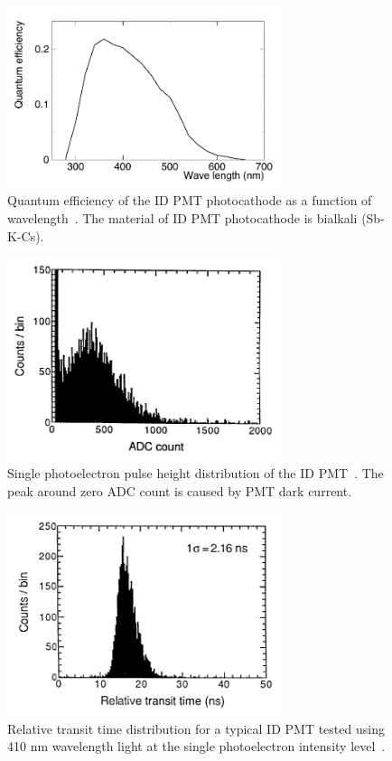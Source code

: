 \begin{figure}[tbp]
	\centering
	\includegraphics[width=8cm]{Figures/SK/IDPMTQE}
	\caption[Quantum efficiency of the ID PMT photocathode as a function of wavelength]{\label{SK_IDPMTQE} Quantum efficiency of the ID PMT photocathode as a function of wavelength~\cite{2003Fukuda}. The material of ID PMT photocathode is bialkali (Sb-K-Cs).}
\end{figure}

\begin{figure}[tbp]
	\centering
	\includegraphics[width=8cm]{Figures/SK/IDPMT1pe}
	\caption[Single photoelectron pulse height distribution of the ID PMT]{\label{SK_IDPMT1pe} Single photoelectron pulse height distribution of the ID PMT~\cite{2003Fukuda}. The peak around zero ADC count is caused by PMT dark current.}
\end{figure}

\begin{figure}[tbp]
	\centering
	\includegraphics[width=8cm]{Figures/SK/IDPMTt}
	\caption[Relative transit time distribution for a typical ID PMT tested using 410 nm wavelength light at the single photoelectron intensity level]{\label{SK_IDPMTt} Relative transit time distribution for a typical ID PMT tested using 410 nm wavelength light at the single photoelectron intensity level~\cite{2003Fukuda}.}
\end{figure}

